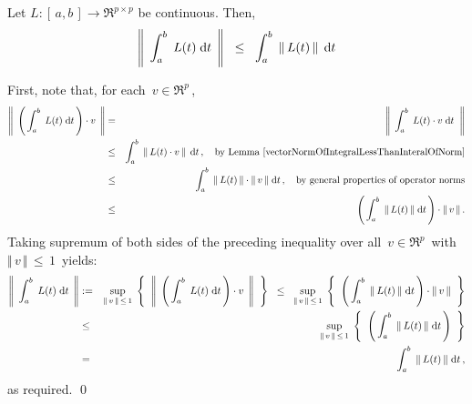 
\vskip 0.5cm
\begin{proposition}\label{matrixNormOfIntegralLessThanInteralOfNorm}
\mbox{}
\vskip 0.1cm
\noindent
Let $L : [\,a,b\,] \longrightarrow \Re^{p \times p}$ be continuous.
Then,
\begin{equation*}
\left\Vert\;\, \int_{a}^{b}\; L(t) \;\textnormal{d} t \,\;\right\Vert
\;\; \leq \;\;
	\int_{a}^{b}\; \left\Vert\, L(t) \,\right\Vert \;\textnormal{d} t
\end{equation*}
\end{proposition}
\proof
First, note that, for each \,$v \in \Re^{p}$\,,
\begin{eqnarray*}
\left\Vert\;\, \left(\,\int_{a}^{b}\; L(t) \;\textnormal{d} t\,\right) \cdot v \,\;\right\Vert
& = &
	\left\Vert\;\, \int_{a}^{b}\; L(t) \cdot v \;\textnormal{d} t \;\;\right\Vert
\\
& \leq &
	\int_{a}^{b}\; \left\Vert\, L(t) \cdot v \,\right\Vert \;\textnormal{d} t\,,
	\quad
	\textnormal{by Lemma \ref{vectorNormOfIntegralLessThanInteralOfNorm}}
\\
& \leq &
	\int_{a}^{b}\; \Vert\, L(t) \,\Vert \cdot \Vert\, v \,\Vert \;\textnormal{d} t\,,
	\quad
	\textnormal{by general properties of operator norms}
\\
& \leq &
	\left(\, \int_{a}^{b}\; \Vert\, L(t) \,\Vert \;\textnormal{d} t \,\right)
	\cdot \Vert\, v \,\Vert\,.
\end{eqnarray*}
Taking supremum of both sides of the preceding inequality
over all \,$v \in \Re^{p}$\, with \,$\Vert\,v\,\Vert\,\leq\,1$\, yields:
\begin{eqnarray*}
\left\Vert\;\, \int_{a}^{b}\; L(t) \;\textnormal{d} t \,\;\right\Vert
& := &
	\underset{\Vert\,v\,\Vert \,\leq\, 1}{\sup}\;
	\left\{\;\;
		\left\Vert\;\, \left(\,\int_{a}^{b}\; L(t) \;\textnormal{d} t\,\right) \cdot v \,\;\right\Vert
		\;\;\right\}
\;\; \leq \;\;
	\underset{\Vert\,v\,\Vert \,\leq\, 1}{\sup}\;
	\left\{\;\;
		\left(\, \int_{a}^{b}\; \Vert\, L(t) \,\Vert \;\textnormal{d} t \,\right)
		\cdot \Vert\, v \,\Vert
		\;\;\right\}
\\
& \leq &
	\underset{\Vert\,v\,\Vert \,\leq\, 1}{\sup}\;
	\left\{\;\;
		\left(\, \int_{a}^{b}\; \Vert\, L(t) \,\Vert \;\textnormal{d} t \,\right)
		\;\;\right\}
\\
& = &
	\int_{a}^{b}\; \Vert\, L(t) \,\Vert \;\textnormal{d} t\,,
\end{eqnarray*} 
as required.
\qed


\renewcommand{\theenumi}{\roman{enumi}}
\renewcommand{\labelenumi}{\textnormal{(\theenumi)}$\;\;$}

